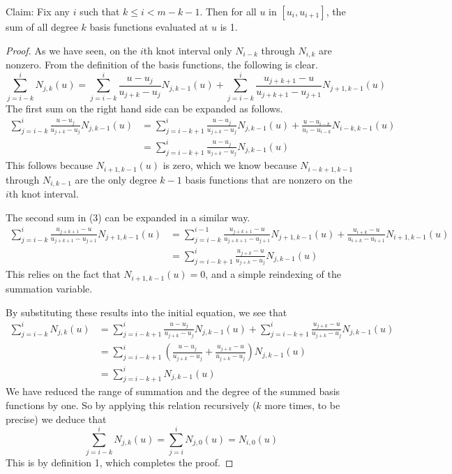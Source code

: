\documentclass[11pt, oneside]{article}   	%
\begin{document}
Claim: Fix any $i$ such that $k \leq i < m - k - 1$. Then for all $u$ in $[u_i, u_{i+1}]$, the sum of all degree $k$ basis functions evaluated at $u$ is 1.
\begin{proof}
As we have seen, on the $i$th knot interval only $N_{i-k}$ through $N_{i, k}$ are nonzero. From the definition of the basis functions, the following is clear.
\begin{equation}
\sum_{j=i-k}^{i} N_{j,k} (u) = \sum_{j=i-k}^{i} \frac{u - u_j}{u_{j+k} - u_j} N_{j, k-1} (u) + \sum_{j=i-k}^{i} \frac{u_{j+k+1} - u}{u_{j+k+1} - u_{j+1}} N_{j+1, k-1} (u)
\end{equation}
The first sum on the right hand side can be expanded as follows.
\begin{align*}
\sum_{j=i-k}^{i} \frac{u - u_j}{u_{j+k} - u_j} N_{j, k-1} (u) &= \sum_{j=i-k+1}^{i} \frac{u - u_j}{u_{j+k} - u_j} N_{j, k-1} (u) + \frac{u - u_{i-k}}{u_{i} - u_{i-k}} N_{i-k, k-1} (u) \\
&= \sum_{j=i-k+1}^{i} \frac{u - u_j}{u_{j+k} - u_j} N_{j, k-1} (u)
\end{align*}
This follows because $N_{i+1, k-1} (u)$ is zero, which we know because $N_{i-k+1, k-1}$ through $N_{i, k-1}$ are the only degree $k-1$ basis functions that are nonzero on the $i$th knot interval.

The second sum in (3) can be expanded in a similar way.
\begin{align*}
\sum_{j=i-k}^{i} \frac{u_{j+k+1} - u}{u_{j+k+1} - u_{j+1}} N_{j+1, k-1} (u) &= \sum_{j=i-k}^{i-1} \frac{u_{j+k+1} - u}{u_{j+k+1} - u_{j+1}} N_{j+1, k-1} (u) + \frac{u_{i+k} - u}{u_{i+k} - u_{i+1}} N_{i+1, k-1} (u) \\
&= \sum_{j=i-k+1}^{i} \frac{u_{j+k} - u}{u_{j+k} - u_j} N_{j, k-1} (u)
\end{align*}
This relies on the fact that $N_{i+1, k-1} (u) = 0$, and a simple reindexing of the summation variable.

By substituting these results into the initial equation, we see that
\begin{align*}
\sum_{j=i-k}^{i} N_{j,k} (u) &= \sum_{j=i-k+1}^{i} \frac{u - u_j}{u_{j+k} - u_j} N_{j, k-1} (u) + \sum_{j=i-k+1}^{i} \frac{u_{j+k} - u}{u_{j+k} - u_j} N_{j, k-1} (u) \\
&= \sum_{j=i-k+1}^{i} \left( \frac{u - u_j}{u_{j+k} - u_j} + \frac{u_{j+k} - u}{u_{j+k} - u_j} \right) N_{j, k-1} (u) \\
&= \sum_{j=i-k+1}^{i} N_{j, k-1} (u)
\end{align*}
We have reduced the range of summation and the degree of the summed basis functions by one. So by applying this relation recursively ($k$ more times, to be precise) we deduce that
\begin{equation}
\sum_{j=i-k}^{i} N_{j,k} (u) = \sum_{j=i}^i N_{j, 0} (u) = N_{i, 0} (u)
\end{equation}
This is by definition 1, which completes the proof.
\end{proof}
\end{document}
